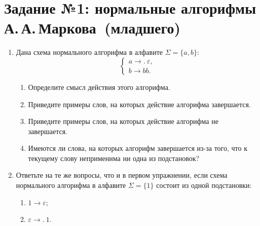 \documentclass[12pt,a4paper]{article}
\renewcommand{\to}{\longrightarrow}
\newcommand{\tof}{\to\!\!.\ }
\newcommand{\alphabet}[2]{#1=\{#2\}}
\newcommand{\salp}[1]{\alphabet{\Sigma}{#1}}
\begin{document}
\section*{Задание №1: нормальные алгорифмы А.\,А.\,Маркова~(младшего)}

\begin{enumerate}

\item Дана схема нормального алгорифма в алфавите $\salp{a, b}$:
\[
  \begin{cases}a\tof\varepsilon,\\ b\to bb. \end{cases}
\]
\begin{enumerate}
\item Определите смысл действия этого алгорифма.
\item Приведите примеры слов, на которых действие алгорифма завершается.
\item Приведите примеры слов, на которых действие алгорифма не завершается.
\item Имеются ли слова, на которых алгорифм завершается из-за того, что к текущему слову неприменима ни одна из подстановок?
\end{enumerate}

\item Ответьте на те же вопросы, что и в первом упражнении, если схема нормального алгорифма в алфавите $\salp{1}$ состоит из одной подстановки:
  \begin{enumerate}
  \item  $1\to\varepsilon$;
  \item $\varepsilon\tof 1$.
  \end{enumerate}


\end{enumerate}
\end{document}
